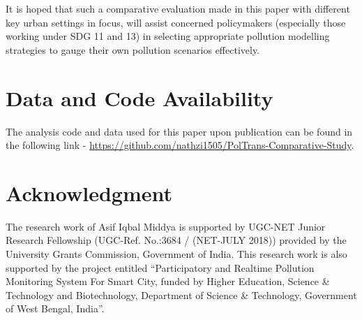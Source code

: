 \documentclass[10pt,journal]{IEEEtran}
\begin{document}
It is hoped that such a comparative evaluation made in this paper with different key urban settings in focus, will assist concerned policymakers (especially those working under SDG 11 and 13) in selecting appropriate pollution modelling strategies to gauge their own pollution scenarios effectively.

\section*{Data and Code Availability}
The analysis code and data used for this paper upon publication can be found in the following link - \url{https://github.com/nathzi1505/PolTrans-Comparative-Study}.

\section*{Acknowledgment}
The research work of Asif Iqbal Middya is supported by UGC-NET Junior Research Fellowship (UGC-Ref. No.:3684 / (NET-JULY 2018)) provided by the University Grants Commission, Government of India. This research work is also supported by the project entitled ``Participatory and Realtime Pollution Monitoring System For Smart City, funded by Higher Education, Science \& Technology and Biotechnology, Department of Science \& Technology, Government of West Bengal, India''.

\ifCLASSOPTIONcaptionsoff
\newpage
\fi



\end{document}
